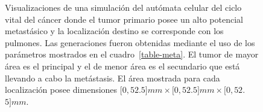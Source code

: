 \begin{figure}[p]
\begin{center}
    
    
    \end{center}\vspace*{-0.6cm}
    \caption[Visualizaciones de una simulaci\'on del aut\'omata celular del ciclo vital del c\'ancer donde el tumor primario posee un alto potencial metast\'asico]{Visualizaciones de una simulaci\'on del aut\'omata celular del ciclo vital del c\'ancer donde el tumor primario posee un alto potencial metast\'asico y la localizaci\'on destino se corresponde con los pulmones. Las generaciones fueron obtenidas mediante el uso de los par\'ametros mostrados en el cuadro~\ref{table-meta}. El tumor de mayor \'area es el principal y el de menor \'area es el secundario que est\'a llevando a cabo la met\'astasis. El \'area mostrada para cada localizaci\'on posee dimensiones $[0,52$.$5]mm \times [0,52$.$5]mm \times [0,52$.$5]mm$.}
    \label{fig-full-automata}
    \end{figure}